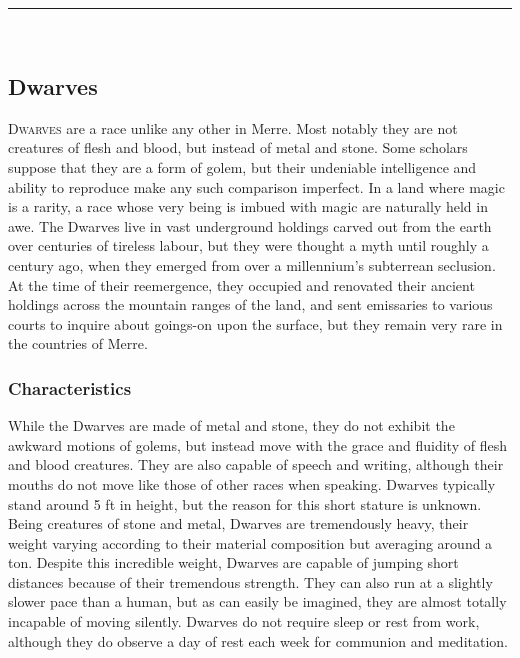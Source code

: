 \documentclass[paper=a4, fontsize=11pt]{scrartcl} %
\newcommand{\horrule}[1]{\rule{\linewidth}{#1}} %
\begin{document}
\horrule{0.5pt} \\[0.4cm] %

\begin{multicols}{2} %

\subsection{Dwarves}

\lettrine[lines=2]{\medievalsharp D}{warves} are a race unlike any other in Merre. Most notably they are not creatures of flesh and blood, but instead of metal and stone. Some scholars suppose that they are a form of golem, but their undeniable intelligence and ability to reproduce make any such comparison imperfect. In a land where magic is a rarity, a race whose very being is imbued with magic are naturally held in awe. The Dwarves live in vast underground holdings carved out from the earth over centuries of tireless labour, but they were thought a myth until roughly a century ago, when they emerged from over a millennium's subterrean seclusion. At the time of their reemergence, they occupied and renovated their ancient holdings across the mountain ranges of the land, and sent emissaries to various courts to inquire about goings-on upon the surface, but they remain very rare in the countries of Merre.

\subsubsection{Characteristics}

While the Dwarves are made of metal and stone, they do not exhibit the awkward motions of golems, but instead move with the grace and fluidity of flesh and blood creatures. They are also capable of speech and writing, although their mouths do not move like those of other races when speaking. Dwarves typically stand around 5 ft in height, but the reason for this short stature is unknown. Being creatures of stone and metal, Dwarves are tremendously heavy, their weight varying according to their material composition but averaging around a ton. Despite this incredible weight, Dwarves are capable of jumping short distances because of their tremendous strength. They can also run at a slightly slower pace than a human, but as can easily be imagined, they are almost totally incapable of moving silently. Dwarves do not require sleep or rest from work, although they do observe a day of rest each week for communion and meditation.


\end{multicols}
\end{document}
